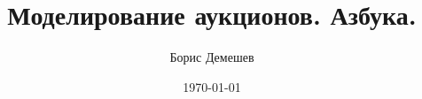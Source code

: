 \documentclass[pdftex,12pt,a4paper]{article}
\title{Моделирование аукционов. Азбука. }
\author{Борис Демешев}
\date{\today}
\numberwithin{equation}{page} %
\theoremstyle{definition} %
\theoremstyle{definition}
\theoremstyle{definition}
\begin{document}
\maketitle
\tableofcontents{}








\printindex %



%
\end{document}
